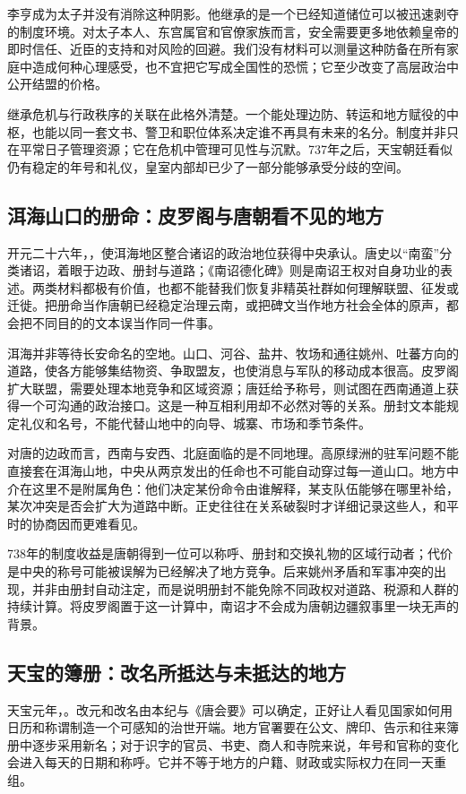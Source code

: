 李亨成为太子并没有消除这种阴影。他继承的是一个已经知道储位可以被迅速剥夺的制度环境。对太子本人、东宫属官和官僚家族而言，安全需要更多地依赖皇帝的即时信任、近臣的支持和对风险的回避。我们没有材料可以测量这种防备在所有家庭中造成何种心理感受，也不宜把它写成全国性的恐慌；它至少改变了高层政治中公开结盟的价格。

继承危机与行政秩序的关联在此格外清楚。一个能处理边防、转运和地方赋役的中枢，也能以同一套文书、警卫和职位体系决定谁不再具有未来的名分。制度并非只在平常日子管理资源；它在危机中管理可见性与沉默。737年之后，天宝朝廷看似仍有稳定的年号和礼仪，皇室内部却已少了一部分能够承受分歧的空间。

\subsection{洱海山口的册命：皮罗阁与唐朝看不见的地方}
开元二十六年，，使洱海地区整合诸诏的政治地位获得中央承认。唐史以“南蛮”分类诸诏，着眼于边政、册封与道路；《南诏德化碑》则是南诏王权对自身功业的表述。两类材料都极有价值，也都不能替我们恢复非精英社群如何理解联盟、征发或迁徙。把册命当作唐朝已经稳定治理云南，或把碑文当作地方社会全体的原声，都会把不同目的的文本误当作同一件事。

洱海并非等待长安命名的空地。山口、河谷、盐井、牧场和通往姚州、吐蕃方向的道路，使各方能够集结物资、争取盟友，也使消息与军队的移动成本很高。皮罗阁扩大联盟，需要处理本地竞争和区域资源；唐廷给予称号，则试图在西南通道上获得一个可沟通的政治接口。这是一种互相利用却不必然对等的关系。册封文本能规定礼仪和名号，不能代替山地中的向导、城寨、市场和季节条件。

对唐的边政而言，西南与安西、北庭面临的是不同地理。高原绿洲的驻军问题不能直接套在洱海山地，中央从两京发出的任命也不可能自动穿过每一道山口。地方中介在这里不是附属角色：他们决定某份命令由谁解释，某支队伍能够在哪里补给，某次冲突是否会扩大为道路中断。正史往往在关系破裂时才详细记录这些人，和平时的协商因而更难看见。

738年的制度收益是唐朝得到一位可以称呼、册封和交换礼物的区域行动者；代价是中央的称号可能被误解为已经解决了地方竞争。后来姚州矛盾和军事冲突的出现，并非由册封自动注定，而是说明册封不能免除不同政权对道路、税源和人群的持续计算。将皮罗阁置于这一计算中，南诏才不会成为唐朝边疆叙事里一块无声的背景。

\subsection{天宝的簿册：改名所抵达与未抵达的地方}
天宝元年，。改元和改名由本纪与《唐会要》可以确定，正好让人看见国家如何用日历和称谓制造一个可感知的治世开端。地方官署要在公文、牌印、告示和往来簿册中逐步采用新名；对于识字的官员、书吏、商人和寺院来说，年号和官称的变化会进入每天的日期和称呼。它并不等于地方的户籍、财政或实际权力在同一天重组。

